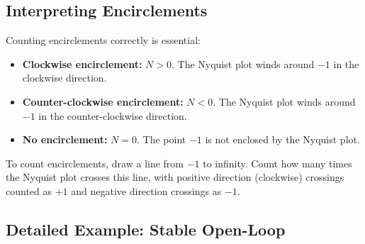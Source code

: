 \subsection{Interpreting Encirclements}

Counting encirclements correctly is essential:

\begin{itemize}
    \item \textbf{Clockwise encirclement:} $N > 0$. The Nyquist plot winds around $-1$ in the clockwise direction.
    \item \textbf{Counter-clockwise encirclement:} $N < 0$. The Nyquist plot winds around $-1$ in the counter-clockwise direction.
    \item \textbf{No encirclement:} $N = 0$. The point $-1$ is not enclosed by the Nyquist plot.
\end{itemize}

To count encirclements, draw a line from $-1$ to infinity. Count how many times the Nyquist plot crosses this line, with positive direction (clockwise) crossings counted as $+1$ and negative direction crossings as $-1$.

\subsection{Detailed Example: Stable Open-Loop}

